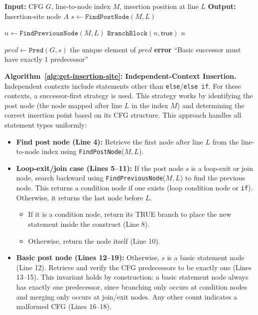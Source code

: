 \documentclass[pdflatex,sn-basic]{sn-jnl}%
\theoremstyle{thmstyleone}%
\theoremstyle{thmstyletwo}%
\theoremstyle{thmstylethree}%
\begin{document}
\begin{algorithm}[!ht]
\caption{Independent-Context Insertion}
\label{alg:get-insertion-site}
\begin{algorithmic}[1]
\State \textbf{Input:} CFG $G$, line-to-node index $M$, insertion position at line $L$
\State \textbf{Output:} Insertion-site node $A$
  \State $s \gets \texttt{FindPostNode}(M, L)$ 

   
    \State $n \gets \texttt{FindPreviousNode}(M, L)$ 
      \State \Return $\texttt{BranchBlock}(n,\mathsf{true})$ 
    \Else
      \State \Return $n$
    \EndIf

  \Else {}
    \State $pred \gets \texttt{Pred}(G, s)$
     \State \Return the unique element of $pred$
    \Else \State \textbf{error} ``Basic successor must have exactly 1 predecessor''
    \EndIf
  \EndIf
\EndFunction
\end{algorithmic}
\end{algorithm}

\noindent\textbf{Algorithm~\ref{alg:get-insertion-site}: Independent-Context Insertion.}
Independent contexts include statements other than \texttt{else}/\texttt{else if}.
For these contexts, a successor-first strategy is used.
This strategy works by identifying the post node (the node mapped after line $L$ in the index $M$) and determining the correct insertion point based on its CFG structure.
This approach handles all statement types uniformly:
\begin{itemize}
  \item \textbf{Find post node (Line 4):} Retrieve the first node after line \(L\) from the line-to-node index using \texttt{FindPostNode}(\(M, L\)).
  \item \textbf{Loop-exit/join case (Lines 5--11):} If the post node \(s\) is a loop-exit or join node, search backward using \texttt{FindPreviousNode}(\(M, L\)) to find the previous node. This returns a condition node if one exists (loop condition node or \texttt{if}). Otherwise, it returns the last node before \(L\).
    \begin{itemize}
      \item If it is a condition node, return its TRUE branch to place the new statement inside the construct (Line 8).
      \item Otherwise, return the node itself (Line 10).
    \end{itemize}
  \item \textbf{Basic post node (Lines 12--19):} Otherwise, \(s\) is a basic statement node (Line 12). Retrieve and verify the CFG predecessors to be exactly one (Lines 13--15). This invariant holds by construction: a basic statement node always has exactly one predecessor, since branching only occurs at condition nodes and merging only occurs at join/exit nodes. Any other count indicates a malformed CFG (Lines 16--18).
\end{itemize}
\end{document}
